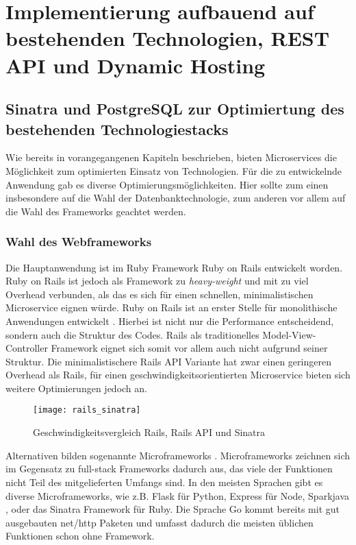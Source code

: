 \chapter{Implementierung aufbauend auf bestehenden Technologien, REST API und Dynamic Hosting}

\section{Sinatra und PostgreSQL zur Optimiertung des bestehenden Technologiestacks}
Wie bereits in vorangegangenen Kapiteln beschrieben, bieten Microservices die Möglichkeit zum optimierten Einsatz von Technologien. Für die zu entwickelnde Anwendung gab es diverse Optimierungsmöglichkeiten. Hier sollte zum einen insbesondere auf die Wahl der Datenbanktechnologie, zum anderen vor allem auf die Wahl des Frameworks geachtet werden.

\subsection{Wahl des Webframeworks}
Die Hauptanwendung ist im Ruby Framework Ruby on Rails \cite{rails} entwickelt worden. Ruby on Rails ist jedoch als Framework zu \textit{heavy-weight} und mit zu viel Overhead verbunden, als das es sich für einen schnellen, minimalistischen Microservice eignen würde. Ruby on Rails ist an erster Stelle für monolithische Anwendungen entwickelt \cite[][]{rails:doctrine}.
Hierbei ist nicht nur die Performance entscheidend, sondern auch die Struktur des Codes. Rails als traditionelles Model-View-Controller Framework \cite[][]{wiki:mvc} eignet sich somit vor allem auch nicht aufgrund seiner Struktur. Die minimalistischere Rails API Variante\cite{rails:api} hat zwar einen geringeren Overhead als Rails, für einen geschwindigkeitsorientierten Microservice bieten sich weitere Optimierungen jedoch an.

\begin{figure}[!ht]
    \centering
    \caption{Geschwindigkeitsvergleich Rails, Rails API und Sinatra \cite{newrelic:soa}}
    \label{fig:speed}
    \texttt{[image: rails\_sinatra]}
\end{figure}

Alternativen bilden sogenannte Microframeworks \cite{wiki:micro}. Microframeworks zeichnen sich im Gegensatz zu full-stack Frameworks dadurch aus, das viele der Funktionen nicht Teil des mitgelieferten Umfangs sind. In den meisten Sprachen gibt es diverse Microframeworks, wie z.B. Flask \cite{flask} für Python, Express \cite{expressjs} für Node, Sparkjava \cite{sparkjava}, oder das Sinatra Framework \cite{sinatra} für Ruby. Die Sprache Go \cite{golang} kommt bereits mit gut ausgebauten net/http Paketen und umfasst dadurch die meisten üblichen Funktionen schon ohne Framework.


